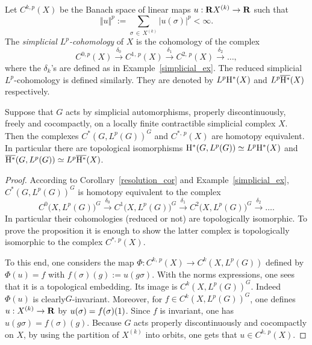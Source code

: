 Let $C^{k,p}(X)$ be the Banach space of linear maps $u: {\bf R} X^{(k)} \to {\bf R}$ such that
\[
\Vert u \Vert^p := \sum _{\sigma\,\in\, X^{(k)}} \vert u(\sigma) \vert^p < \infty.
\]
The \emph{simplicial $L^p$-cohomology} of $X$ is the cohomology of the complex
\[
C^{0,p}(X) \stackrel{\delta _0}{\to} C^{1,\,p}(X) \stackrel{\delta _1}{\to} C^{2,\,p}(X) \stackrel{\delta _2}{\to}\dots,
\]
where the $\delta_k$'s are defined as in Example~\ref{simplicial_ex}. The reduced simplicial $L^p$-cohomology is defined similarly. They are denoted by $L^p {\rm H}^*(X)$ and $L^p\overline{{\rm H}^*} (X)$ respectively.


\begin{prop}\label{simplicial_prop}
Suppose that $G$ acts by simplicial automorphisms, properly discontinuously, freely and cocompactly, on a locally finite contractible simplicial complex $X$. Then the complexes $C^*(G,L^p(G))^G$ and $C^{*,\,p}(X)$ are homotopy equivalent. In particular there are topological isomorphisms ${\rm H}^* (G, L^p(G) ) \simeq L^p{\rm H}^* (X)$ and $\overline{{\rm H}^*} (G, L^p(G)) \simeq L^p\overline{{\rm H}^*} (X)$.
\end{prop}

\begin{proof}
According to Corollary~\ref{resolution_cor} and Example~\ref{simplicial_ex}, $C^*(G,L^p(G))^G$ is homotopy equivalent to the complex
\[
C^0\bigl(X,L^p(G)\bigr)^G \stackrel{\delta_0}{\to} C^1\bigl(X,L^p(G)\bigr)^G \stackrel{\delta_1}{\to} C^2\bigl(X,L^p(G)\bigr)^G \stackrel{\delta_2}{\to}\dots.
\]
In particular their cohomologies (reduced or not) are topologically isomorphic. To prove the proposition it is enough to show the latter complex is topologically isomorphic to the complex $C^{*,\,p}(X)$.

To this end, one considers the map $\Phi: C^{k,\,p}(X) \to C^k(X,L^p(G))$ defined by $\Phi (u) = f$ with $f(\sigma)(g):= u(g\sigma)$. With the norms expressions, one sees that it is a topological embedding. Its image is $C^k(X,L^p(G))^G$. Indeed $\Phi (u)$ is clearly\linebreak$G$-invariant. Moreover, for $f \in C^k(X,L^p(G))^G$, one defines $u: X^{(k)} \to {\bf R}$ by $u(\sigma)\linebreak= f(\sigma)(1)$. Since $f$ is invariant, one has $u (g \sigma) = f(\sigma)(g)$. Because $G$ acts properly discontinuously and cocompactly on $X$, by using the partition of $X^{(k)}$ into orbits, one gets that $u \in C^{k,\,p}(X)$.
\end{proof}


